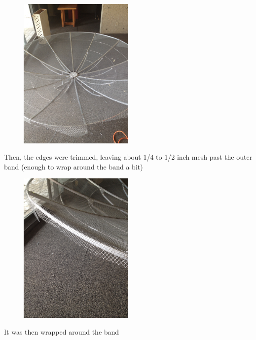\documentclass[11pt]{article} %
\begin{document}
\begin{figure}
  \centering
  \caption{   }
  \includegraphics[width=0.50\textwidth]{dish/16.jpeg}
\end{figure}

Then, the edges were trimmed, leaving about 1/4 to 1/2 inch mesh past the outer band (enough to wrap around the band a bit)

\begin{figure}
  \centering
  \caption{   }
  \includegraphics[width=0.50\textwidth]{dish/17.jpeg}
\end{figure}

It was then wrapped around the band
\end{document}
